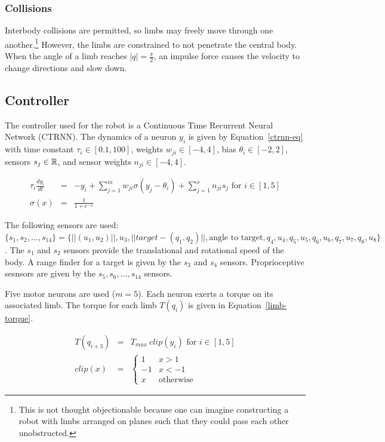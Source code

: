 \subsubsection{Collisions}

Interbody collisions are permitted, so limbs may freely move through
one another.\footnote{This is not thought objectionable because one
  can imagine constructing a robot with limbs arranged on planes such
  that they could pass each other unobstructed.}  However, the limbs
are constrained to not penetrate the central body.  When the angle of
a limb reaches $|q| = \frac{\pi}{2}$, an impulse force causes the
velocity to change directions and slow down.


\subsection{Controller}

The controller used for the robot is a Continuous Time Recurrent
Neural Network (CTRNN).  The dynamics of a neuron $y_i$ is given by
Equation~\ref{ctrnn-eq} with time constant $\tau_i \in [0.1, 100]$,
weights $w_{ji} \in [-4, 4]$, bias $\theta_i \in [-2, 2]$, sensors
$s_j \in \mathbb{R} $, and sensor weights $n_{ji} \in [-4, 4]$.

\begin{eqnarray}
  \tau_i \frac{d y_i}{dt} &=& -y_i + \sum_{j = 1}^m w_{ji} \sigma(y_j - \theta_i) + \sum_{j=1}^s n_{ji} s_j \text{ for } i \in [1,5] \label{ctrnn-eq} \\
  \sigma(x) &=& \frac{1}{1 + e^{-x}}
\end{eqnarray}

The following sensors are used: $\{s_1, s_2, \ldots, s_{14}\} =
\{||(u_1, u_2)||, u_3, ||target - (q_1, q_2)||, \text{angle to
  target}, q_4, u_4, q_5, u_5, q_6, u_6, q_7, u_7, q_8, u_8\}$.  The
$s_1$ and $s_2$ sensors provide the translational and rotational speed
of the body.  A range finder for a target is given by the $s_3$ and
$s_4$ sensors.  Proprioceptive sesnsors are given by the $s_5, s_6,
\ldots, s_{14}$ sensors.

Five motor neurons are used ($m = 5$).  Each neuron exerts a torque on
its associated limb.  The torque for each limb $T(q_i)$ is given in
Equation~\ref{limb-torque}.

\begin{eqnarray}
  T(q_{i + 3}) &=& T_{max}~clip(y_i) \text{ for } i \in [1,5] \label{limb-torque} \\
  clip(x) &=& \begin{cases}
              1 & x > 1 \\
              -1 & x < -1 \\
              x & \text{otherwise} 
              \end{cases}
\end{eqnarray}

